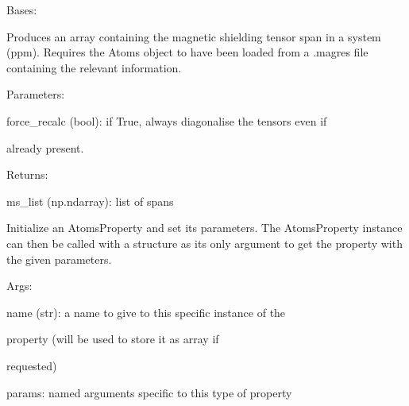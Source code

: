 \documentclass[letterpaper,10pt,english]{sphinxmanual}
\begin{document}
\begin{fulllineitems}
\label{doctree/soprano.properties.nmr.ms:soprano.properties.nmr.ms.MSSpan}
Bases: {\hyperref[doctree/soprano.properties.atomsproperty:soprano.properties.atomsproperty.AtomsProperty]{\emph{}}}

Produces an array containing the magnetic shielding tensor span
in a system (ppm).
Requires the Atoms object to have been loaded from a .magres file
containing the relevant information.

\begin{DUlineblock}{0em}
\item[] Parameters:
\item[]
\begin{DUlineblock}{\DUlineblockindent}
\item[] force\_recalc (bool): if True, always diagonalise the tensors even if
\item[]
\begin{DUlineblock}{\DUlineblockindent}
\item[] already present.
\end{DUlineblock}
\end{DUlineblock}
\end{DUlineblock}

\begin{DUlineblock}{0em}
\item[] Returns:
\item[]
\begin{DUlineblock}{\DUlineblockindent}
\item[] ms\_list (np.ndarray): list of spans
\end{DUlineblock}
\end{DUlineblock}

Initialize an AtomsProperty and set its parameters.
The AtomsProperty instance can then be called with a structure as its
only argument to get the property with the given parameters.

\begin{DUlineblock}{0em}
\item[] Args:
\item[]
\begin{DUlineblock}{\DUlineblockindent}
\item[] name (str): a name to give to this specific instance of the
\item[]
\begin{DUlineblock}{\DUlineblockindent}
\item[] property (will be used to store it as array if
\item[] requested)
\end{DUlineblock}
\item[] params: named arguments specific to this type of property
\end{DUlineblock}
\end{DUlineblock}


\end{fulllineitems}
\end{document}
